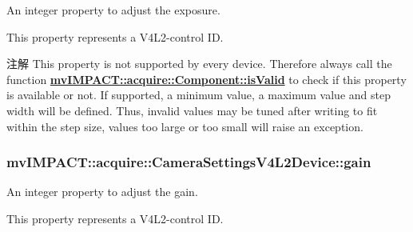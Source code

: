 An integer property to adjust the exposure. 

This property represents a V4\+L2-\/control I\+D.

\begin{DoxyNote}{注解}
This property is not supported by every device. Therefore always call the function {\bfseries \hyperlink{classmv_i_m_p_a_c_t_1_1acquire_1_1_component_ac51e55e7e046101f3c6119d84123abd5}{mv\+I\+M\+P\+A\+C\+T\+::acquire\+::\+Component\+::is\+Valid}} to check if this property is available or not. If supported, a minimum value, a maximum value and step width will be defined. Thus, invalid values may be tuned after writing to fit within the step size, values too large or too small will raise an exception. 
\end{DoxyNote}
\hypertarget{classmv_i_m_p_a_c_t_1_1acquire_1_1_camera_settings_v4_l2_device_a3264adc428c3d0c9c8987ce06b3adfdb}{
\subsubsection[{gain}]{ mv\+I\+M\+P\+A\+C\+T\+::acquire\+::\+Camera\+Settings\+V4\+L2\+Device\+::gain}}\label{classmv_i_m_p_a_c_t_1_1acquire_1_1_camera_settings_v4_l2_device_a3264adc428c3d0c9c8987ce06b3adfdb}


An integer property to adjust the gain. 

This property represents a V4\+L2-\/control I\+D.


